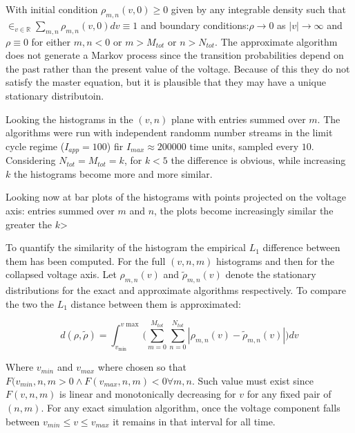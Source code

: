 With initial condition $\rho_{m,n}(v,0)\ge 0$ given by any integrable density such that $\in_{v\in\mathbb{R}}\sum\limits_{m,n}\rho_{m, n}(v, 0)dv \equiv 1$ and boundary conditions:$\rho\rightarrow 0$ as $|v|\rightarrow\infty$ and $\rho\equiv 0$ for either $m, n<0$ or $m> M_{tot}$ or $n>N_{tot}$.
The approximate algorithm does not generate a Markov process since the transition probabilities depend on the past rather than the present value of the voltage.
Because of this they do not satisfy the master equation, but it is plausible that they may have a unique stationary distributoin.

Looking the histograms in the $(v, n)$ plane with entries summed over $m$.
The algorithms were run with independent randomm number streams in the limit cycle regime ($I_{app} = 100$) fir $I_{max} \approx 200000$ time units, sampled every $10$.
Considering $N_{tot} = M_{tot} = k$, for $k<5$ the difference is obvious, while increasing $k$ the histograms become more and more similar.

Looking now at bar plots of the histograms with points projected on the voltage axis: entries summed over $m$ and $n$, the plots become increasingly similar the greater the $k$>

To quantify the similarity of the histogram the empirical $L_1$ difference between them has been computed.
For the full $(v, n, m)$ histograms and then for the collapsed voltage axis.
Let $\rho_{m,n}(v)$ and $\tilde{\rho}_{m, n}(v)$ denote the stationary distributions for the exact and approximate algorithms respectively.
To compare the two the $L_1$ distance between them is approximated:

$$d(\rho,\tilde{\rho}) = \int_{v_{\min}}^{v{\max}}\biggl(\sum\limits_{m=0}^{M_{tot}}\sum\limits_{n=0}^{N_{tot}}|\rho_{m, n}(v)-\tilde{\rho}_{m,n}(v)|\biggr)dv$$

Where $v_{min}$ and $v_{max}$ where chosen so that $F(v_{min}, n, m>0\land F(v_{max}, n, m)<0\forall m,n$.
Such value must exist since $F(v,n,m)$ is linear and monotonically decreasing for $v$ for any fixed pair of $(n,m)$.
For any exact simulation algorithm, once the voltage component falls between $v_{min}\le v \le v_{max}$ it remains in that interval for all time.


